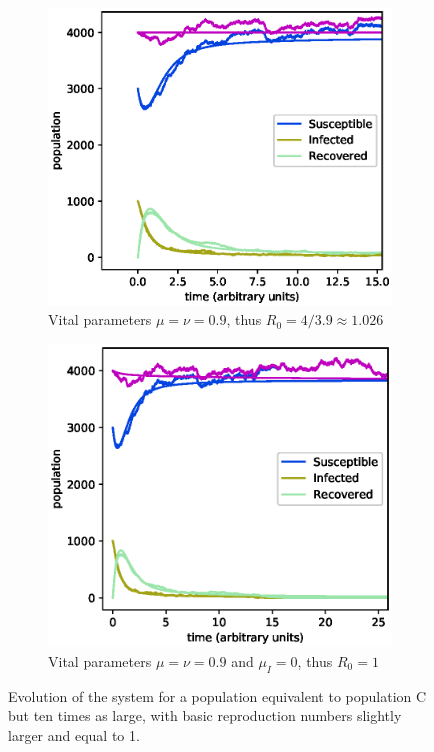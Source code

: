 \documentclass[a4paper,10pt,twocolumn]{article}
\begin{document}
\begin{figure}
	\centering
	\begin{subfigure}{\linewidth}
		\centering
		\includegraphics[width=\linewidth]{a4b3c05e09d09_x10_1.eps}
		\caption{Vital parameters $\mu=\nu=0.9$, thus $R_0=4/3.9\approx1.026$}
		\label{fig:cstay}
	\end{subfigure}
	\begin{subfigure}{\linewidth}
		\centering
		\includegraphics[width=\linewidth]{a4b3c05e09d09dI01_x10_1.eps}
		\caption{Vital parameters $\mu=\nu=0.9$ and $\mu_I=0$, thus $R_0=1$}
		\label{fig:cgon}
	\end{subfigure}
	\caption{Evolution of the system for a population equivalent to population C but ten times as large, with basic reproduction numbers slightly larger and equal to 1.}
	\label{fig:c}
\end{figure}
\end{document}
